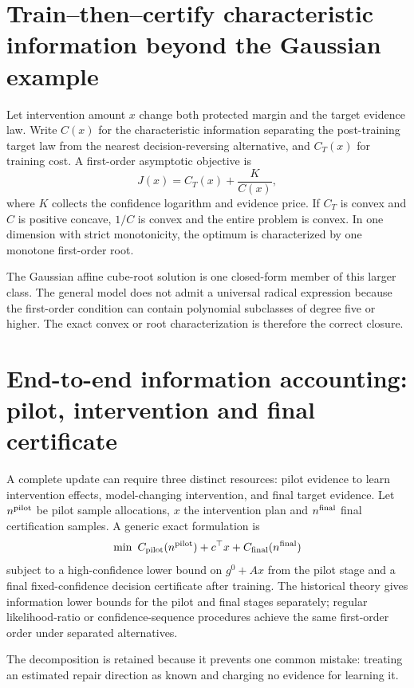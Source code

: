 \documentclass[11pt,letterpaper]{article}
\theoremstyle{plain}
\newcommand{\1}{\mathbf 1}
\begin{document}
\section{Train--then--certify characteristic information beyond the Gaussian example}
Let intervention amount $x$ change both protected margin and the target evidence law. Write $C(x)$ for the characteristic information separating the post-training target law from the nearest decision-reversing alternative, and $C_T(x)$ for training cost. A first-order asymptotic objective is
\begin{equation}
 J(x)=C_T(x)+\frac{K}{C(x)},
\end{equation}
where $K$ collects the confidence logarithm and evidence price. If $C_T$ is convex and $C$ is positive concave, $1/C$ is convex and the entire problem is convex. In one dimension with strict monotonicity, the optimum is characterized by one monotone first-order root.

The Gaussian affine cube-root solution is one closed-form member of this larger class. The general model does not admit a universal radical expression because the first-order condition can contain polynomial subclasses of degree five or higher. The exact convex or root characterization is therefore the correct closure.

\clearpage
\section{End-to-end information accounting: pilot, intervention and final certificate}
A complete update can require three distinct resources: pilot evidence to learn intervention effects, model-changing intervention, and final target evidence. Let $n^{\rm pilot}$ be pilot sample allocations, $x$ the intervention plan and $n^{\rm final}$ final certification samples. A generic exact formulation is
\begin{equation}
 \min\ C_{\rm pilot}(n^{\rm pilot})+c^\top x+C_{\rm final}(n^{\rm final})
\end{equation}
subject to a high-confidence lower bound on $g^0+A x$ from the pilot stage and a final fixed-confidence decision certificate after training. The historical theory gives information lower bounds for the pilot and final stages separately; regular likelihood-ratio or confidence-sequence procedures achieve the same first-order order under separated alternatives.

The decomposition is retained because it prevents one common mistake: treating an estimated repair direction as known and charging no evidence for learning it.
\end{document}

